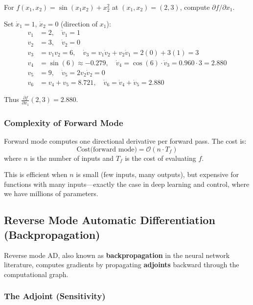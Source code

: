 \begin{example}
\label{ex:forward_mode}
For $f(x_1, x_2) = \sin(x_1 x_2) + x_2^2$ at $(x_1, x_2) = (2, 3)$, compute $\partial f / \partial x_1$.

Set $\dot{x}_1 = 1$, $\dot{x}_2 = 0$ (direction of $x_1$):
\begin{align}
v_1 &= 2, \quad \dot{v}_1 = 1 \\
v_2 &= 3, \quad \dot{v}_2 = 0 \\
v_3 &= v_1 v_2 = 6, \quad \dot{v}_3 = v_1 \dot{v}_2 + v_2 \dot{v}_1 = 2(0) + 3(1) = 3 \\
v_4 &= \sin(6) \approx -0.279, \quad \dot{v}_4 = \cos(6) \cdot \dot{v}_3 = 0.960 \cdot 3 = 2.880 \\
v_5 &= 9, \quad \dot{v}_5 = 2 v_2 \dot{v}_2 = 0 \\
v_6 &= v_4 + v_5 = 8.721, \quad \dot{v}_6 = \dot{v}_4 + \dot{v}_5 = 2.880
\end{align}

Thus $\frac{\partial f}{\partial x_1}(2,3) = 2.880$.
\end{example}

\subsubsection{Complexity of Forward Mode}

Forward mode computes one directional derivative per forward pass. The cost is:
\begin{equation}
\text{Cost(forward mode)} = \mathcal{O}(n \cdot T_f)
\end{equation}
where $n$ is the number of inputs and $T_f$ is the cost of evaluating $f$.

This is efficient when $n$ is small (few inputs, many outputs), but expensive for functions with many inputs---exactly the case in deep learning and control, where we have millions of parameters.

\subsection{Reverse Mode Automatic Differentiation (Backpropagation)}

Reverse mode AD, also known as \textbf{backpropagation} in the neural network literature, computes gradients by propagating \textbf{adjoints} backward through the computational graph.

\subsubsection{The Adjoint (Sensitivity)}

